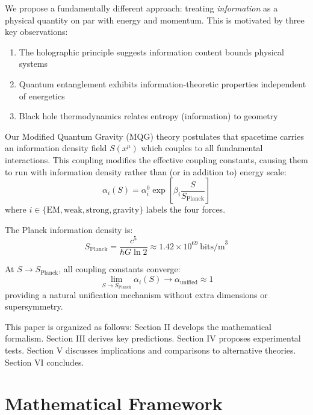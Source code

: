 \documentclass[twocolumn,prd,superscriptaddress,nofootinbib]{revtex4-2}
\newcommand{\sfield}{S}
\newcommand{\splanck}{S_{\text{Planck}}}
\begin{document}
We propose a fundamentally different approach: treating \textit{information} as a physical quantity on par with energy and momentum. This is motivated by three key observations:
\begin{enumerate}
\item The holographic principle suggests information content bounds physical systems \cite{tHooft1993,Susskind1995}
\item Quantum entanglement exhibits information-theoretic properties independent of energetics \cite{Nielsen2000}
\item Black hole thermodynamics relates entropy (information) to geometry \cite{Bekenstein1973,Hawking1975}
\end{enumerate}

Our Modified Quantum Gravity (MQG) theory postulates that spacetime carries an information density field $\sfield(x^\mu)$ which couples to all fundamental interactions. This coupling modifies the effective coupling constants, causing them to run with information density rather than (or in addition to) energy scale:
\begin{equation}
\alpha_i(\sfield) = \alpha_i^0 \exp\left[\beta_i \frac{\sfield}{\splanck}\right]
\label{eq:running_couplings}
\end{equation}
where $i \in \{\text{EM}, \text{weak}, \text{strong}, \text{gravity}\}$ labels the four forces.

The Planck information density is:
\begin{equation}
\splanck = \frac{c^5}{\hbar G \ln 2} \approx 1.42 \times 10^{69}~\text{bits/m}^3
\end{equation}

At $\sfield \to \splanck$, all coupling constants converge:
\begin{equation}
\lim_{\sfield \to \splanck} \alpha_i(\sfield) \to \alpha_{\text{unified}} \approx 1
\end{equation}
providing a natural unification mechanism without extra dimensions or supersymmetry.

This paper is organized as follows: Section II develops the mathematical formalism. Section III derives key predictions. Section IV proposes experimental tests. Section V discusses implications and comparisons to alternative theories. Section VI concludes.

\section{Mathematical Framework}
\end{document}

